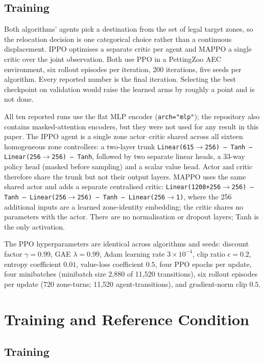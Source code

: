 \documentclass[conference]{IEEEtran}
\begin{document}
\subsection{Training}
\label{sec:training-setup}

Both algorithms' agents pick a destination from the set of legal target zones,
so the relocation decision is one categorical choice rather than a continuous
displacement. IPPO optimises a separate critic per agent and MAPPO a single
critic over the joint observation. Both use PPO in a PettingZoo AEC
environment, six rollout episodes per iteration, 200 iterations, five seeds
per algorithm. Every reported number is the final iteration. Selecting the
best checkpoint on validation would raise the learned arms by roughly a point
and is not done.

All ten reported runs use the flat MLP encoder (\texttt{arch="mlp"}); the
repository also contains masked-attention encoders, but they were not used for
any result in this paper. The IPPO agent is a single zone actor--critic shared
across all sixteen homogeneous zone controllers: a two-layer trunk
\texttt{Linear(615$\to$256) -- Tanh -- Linear(256$\to$256) -- Tanh}, followed
by two separate linear heads, a 33-way policy head (masked before sampling)
and a scalar value head. Actor and critic therefore share the trunk but not
their output layers. MAPPO uses the same shared actor and adds a separate
centralised critic: \texttt{Linear(1208+256$\to$256) -- Tanh --
Linear(256$\to$256) -- Tanh -- Linear(256$\to$1)}, where the 256 additional
inputs are a learned zone-identity embedding; the critic shares no parameters
with the actor. There are no normalisation or dropout layers; Tanh is the only
activation.

The PPO hyperparameters are identical across algorithms and seeds: discount
factor $\gamma=0.99$, GAE $\lambda=0.99$, Adam learning rate
$3\times10^{-4}$, clip ratio $\epsilon=0.2$, entropy coefficient $0.01$,
value-loss coefficient $0.5$, four PPO epochs per update, four minibatches
(minibatch size 2{,}880 of 11{,}520 transitions), six rollout episodes per
update (720 zone-turns; 11{,}520 agent-transitions), and gradient-norm clip
$0.5$.

\section{Training and Reference Condition}
\label{sec:results}

\subsection{Training}
\label{sec:convergence}
\end{document}
